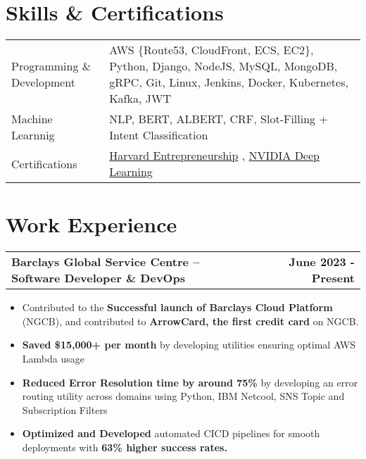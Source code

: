 \documentclass[letterpaper,12pt]{article}
\makeatletter
\newenvironment{joblong}[2]
    {
    \begin{tabularx}{\linewidth}{@{}l X r@{}}
    \textbf{#1} & \hfill &  #2 \\[3.75pt]
    \end{tabularx}
    \begin{minipage}[t]{\linewidth}
    \begin{itemize}[nosep,after=\strut, leftmargin=1em, itemsep=3pt,label=--]
    }
    {
    \end{itemize}
    \end{minipage}    
    }
\makeatother
\begin{document}
\section{Skills \& Certifications}
\begin{tabularx}{\linewidth}{@{}l X@{}}
Programming \& Development &  \normalsize{AWS \{Route53, CloudFront, ECS, EC2\}, Python, Django, NodeJS, MySQL, MongoDB, gRPC, Git, Linux, Jenkins, Docker, Kubernetes, Kafka, JWT}\\
Machine Learnnig &  \normalsize{NLP, BERT, ALBERT, CRF, Slot-Filling + Intent Classification}\\  
Certifications & \normalsize{\href{https://courses.edx.org/certificates/09ce93111ee34656b2351006a9a4ebad}{Harvard Entrepreneurship} , \href{https://learn.nvidia.com/certificates?id=0dfcf9b3a87143c59605f8179bd6ebb8}{NVIDIA Deep Learning}}
\end{tabularx}


\vspace{-5pt}
\section{Work Experience}
\vspace{-5pt}
\begin{joblong}{Barclays Global Service Centre -- Software Developer \& DevOps}{\textbf{June 2023 - Present}}
\item Contributed to the \textbf{Successful launch of Barclays Cloud Platform} (NGCB), and contributed to \textbf{ArrowCard, the first credit card} on NGCB.
\item \textbf{Saved \$15,000+ per month} by developing utilities ensuring optimal AWS Lambda usage
\item \textbf{Reduced Error Resolution time by around 75\%} by developing an error routing utility across domains using Python, IBM Netcool, SNS Topic and Subscription Filters
\item \textbf{Optimized and Developed} automated CICD pipelines for smooth deployments with \textbf{63\% higher success rates.}
\end{joblong}
\end{document}
